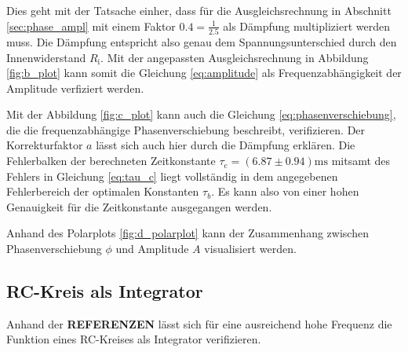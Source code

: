 \noindent
Dies geht mit der Tatsache einher, dass für die Ausgleichsrechnung in Abschnitt \ref{sec:phase_ampl} mit einem Faktor 
$\num{0.4} = \frac{1}{\num{2.5}}$ als Dämpfung multipliziert werden muss.
Die Dämpfung entspricht also genau dem Spannungsunterschied durch den Innenwiderstand $R_\text{i}$.
Mit der angepassten Ausgleichsrechnung in Abbildung \ref{fig:b_plot} kann somit die Gleichung \eqref{eq:amplitude} 
als Frequenzabhängigkeit der Amplitude verfiziert werden.

\noindent
Mit der Abbildung \ref{fig:c_plot} kann auch die Gleichung \eqref{eq:phasenverschiebung}, die die frequenzabhängige Phasenverschiebung 
beschreibt, verifizieren.
Der Korrekturfaktor $a$ lässt sich auch hier durch die Dämpfung erklären.
Die Fehlerbalken der berechneten Zeitkonstante $\tau_\text{c} = (\num{6.87} \pm \num{0.94}) \unit{\milli\s}$ mitsamt des Fehlers
in Gleichung \eqref{eq:tau_c} liegt vollständig in dem angegebenen Fehlerbereich der optimalen Konstanten $\tau_b$.
Es kann also von einer hohen Genauigkeit für die Zeitkonstante ausgegangen werden.

\noindent
Anhand des Polarplots \ref{fig:d_polarplot} kann der Zusammenhang zwischen Phasenverschiebung $\phi$ und Amplitude $A$ visualisiert werden.




\subsection{RC-Kreis als Integrator}
Anhand der \textbf{REFERENZEN} lässt sich für eine ausreichend hohe Frequenz die Funktion eines RC-Kreises als Integrator verifizieren.
